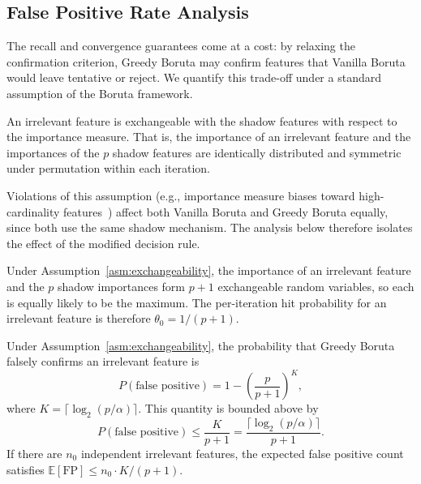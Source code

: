 \documentclass[runningheads]{llncs}
\begin{document}

\subsection{False Positive Rate Analysis}
\label{sec:method:fpr}

The recall and convergence guarantees come at a cost: by relaxing the confirmation criterion, Greedy Boruta may confirm features that Vanilla Boruta would leave tentative or reject. We quantify this trade-off under a standard assumption of the Boruta framework.

\begin{assumption}
\label{asm:exchangeability}
An irrelevant feature is exchangeable with the shadow features with respect to the importance measure. That is, the importance of an irrelevant feature and the importances of the $p$ shadow features are identically distributed and symmetric under permutation within each iteration.
\end{assumption}

Violations of this assumption (e.g., importance measure biases toward high-cardinality features~\cite{strobl2007bias}) affect both Vanilla Boruta and Greedy Boruta equally, since both use the same shadow mechanism. The analysis below therefore isolates the effect of the modified decision rule.

Under Assumption~\ref{asm:exchangeability}, the importance of an irrelevant feature and the $p$ shadow importances form $p+1$ exchangeable random variables, so each is equally likely to be the maximum. The per-iteration hit probability for an irrelevant feature is therefore $\theta_0 = 1/(p+1)$.

\begin{theorem}
\label{thm:fpr}
Under Assumption~\ref{asm:exchangeability}, the probability that Greedy Boruta falsely confirms an irrelevant feature is
\begin{equation}
\label{eq:fpr_exact}
    P(\text{false positive}) = 1 - \left(\frac{p}{p+1}\right)^{K},
\end{equation}
where $K = \lceil \log_2(p/\alpha) \rceil$. This quantity is bounded above by
\begin{equation}
\label{eq:fpr_bound}
    P(\text{false positive}) \leq \frac{K}{p + 1} = \frac{\lceil \log_2(p/\alpha) \rceil}{p + 1}.
\end{equation}
If there are $n_0$ independent irrelevant features, the expected false positive count satisfies $\mathbb{E}[\text{FP}] \leq n_0 \cdot K / (p+1)$.
\end{theorem}
\end{document}

